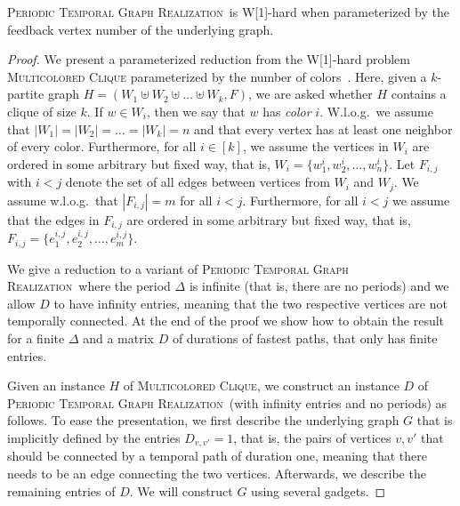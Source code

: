 \documentclass[a4paper,UKenglish,cleveref, autoref, thm-restate]{lipics-v2021}
\newcommand{\deltaExactLong}{\textsc{Periodic Temporal Graph Realization}}
\begin{document}
\begin{theorem}\label{thm:W1wrtFVS}
    \deltaExactLong\ is W[1]-hard when parameterized by the feedback vertex number of the underlying graph.
\end{theorem}
\begin{proof}
    We present a parameterized reduction from the W[1]-hard problem \textsc{Multicolored Clique} parameterized by the number of colors~\cite{fellows2009multipleinterval}.  Here, given a $k$-partite graph $H=(W_1\uplus W_2 \uplus\ldots\uplus W_k, F)$, we are asked whether $H$ contains a clique of size $k$. If $w\in W_i$, then we say that $w$ has \emph{color} $i$. W.l.o.g.\ we assume that $|W_1|=|W_2|=\ldots=|W_k|=n$ and that every vertex has at least one neighbor of every color. 
    Furthermore, for all $i\in[k]$, we assume the vertices in $W_i$ are ordered in some arbitrary but fixed way, that is, $W_i=\{w^i_1,w^i_2,\ldots,w^i_n\}$.
    Let $F_{i,j}$ with $i<j$ denote the set of all edges between vertices from $W_i$ and $W_j$. We assume w.l.o.g.\ that $|F_{i,j}|=m$ for all $i< j$.
    Furthermore, for all $i<j$ we assume that the edges in $F_{i,j}$ are ordered in some arbitrary but fixed way, that is, $F_{i,j}=\{e^{i,j}_1,e^{i,j}_2,\ldots,e^{i,j}_m\}$.

We give a reduction to a variant of \deltaExactLong\ where the period $\Delta$ is infinite (that is, there are no periods) and we allow $D$ to have infinity entries, meaning that the two respective vertices are not temporally connected. At the end of the proof we show how to obtain the result for a finite $\Delta$ and a matrix $D$ of durations of fastest paths, that only has finite entries.

    Given an instance $H$ of \textsc{Multicolored Clique}, we construct an instance $D$ of \deltaExactLong\ (with infinity entries and no periods) as follows. To ease the presentation, we first describe the underlying graph $G$ that is implicitly defined by the entries $D_{v,v'}=1$, that is, the pairs of vertices $v,v'$ that should be connected by a temporal path of duration one, meaning that there needs to be an edge connecting the two vertices. Afterwards, we describe the remaining entries of $D$.
    We will construct $G$ using several gadgets. 
    

\end{proof}
\end{document}
